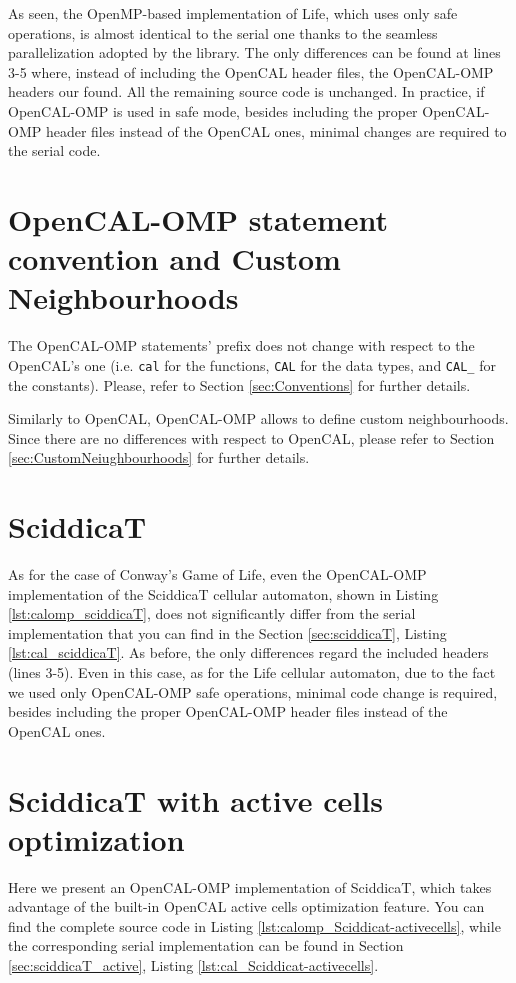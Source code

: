As seen, the OpenMP-based implementation of Life, which uses
only safe operations, is almost identical to the serial one thanks to
the seamless parallelization adopted by the library.  The only
differences can be found at lines 3-5 where, instead of including the
OpenCAL header files, the OpenCAL-OMP headers our found. All the
remaining source code is unchanged. In practice, if 
OpenCAL-OMP is used in safe mode, besides including the proper OpenCAL-OMP
header files instead of the OpenCAL ones, minimal changes are required
to the serial code.

\section{OpenCAL-OMP statement convention and Custom Neighbourhoods}

The OpenCAL-OMP statements' prefix does not change with respect to the
OpenCAL's one (i.e. \verb'cal' for the functions, \verb'CAL' for the
data types, and \verb'CAL_' for the constants). Please, refer to
Section \ref{sec:Conventions} for further details.

Similarly to OpenCAL, OpenCAL-OMP allows to define custom
neighbourhoods. Since there are no differences with respect to
OpenCAL, please refer to Section \ref{sec:CustomNeiughbourhoods} for
further details.

\section{SciddicaT}

As for the case of Conway's Game of Life, even the OpenCAL-OMP
implementation of the SciddicaT cellular automaton, shown in Listing
\ref{lst:calomp_sciddicaT}, does not significantly differ from the
serial implementation that you can find in the Section
\ref{sec:sciddicaT}, Listing \ref{lst:cal_sciddicaT}. As before, the
only differences regard the included headers (lines 3-5). Even in this
case, as for the Life cellular automaton, due to the fact we used only
OpenCAL-OMP safe operations, minimal code change is required, besides
including the proper OpenCAL-OMP header files instead of the OpenCAL
ones.



\section{SciddicaT with active cells optimization}
Here we present an OpenCAL-OMP implementation of SciddicaT, which takes
advantage of the built-in OpenCAL active cells optimization feature. You can
find the complete source code in Listing
\ref{lst:calomp_Sciddicat-activecells}, while the corresponding serial
implementation can be found in Section
\ref{sec:sciddicaT_active}, Listing
\ref{lst:cal_Sciddicat-activecells}.

